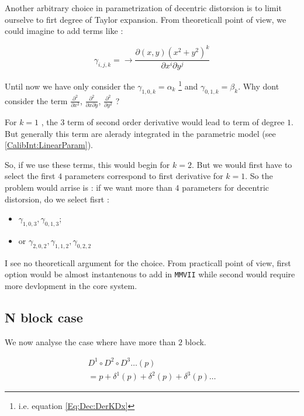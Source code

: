 Another arbitrary choice in parametrization of decentric distorsion is to limit
ourselve to firt degree of Taylor expansion. From theoreticall point of view, we could imagine to add terms like :

\begin{equation}
   \gamma_{i,j,k} = \rightarrow \frac{\partial (x,y)(x^2+y^2)^k}{\partial x^i \partial y^j}
\end{equation}

Until now we have only consider the $\gamma_{1,0,k}=\alpha_k$  \footnote{i.e. equation \ref{Eq:Dec:DerKDx}} and  $\gamma_{0,1,k} = \beta_k$.
Why dont consider the term $ \frac{\partial^2 }{\partial x^2} $, $ \frac{\partial^2 }{\partial x \partial y} $,
 $ \frac{\partial^2 }{\partial y ^2} $ ? 

For $k=1$ , the $3$ term of second order derivative would lead to term of degree $1$. But 
generally this term are alerady integrated in  the parametric model (see \ref{CalibInt:LinearParam}).


So, if we use these terms, this would begin for $k=2$. But we would  first have to select the  first $4$ parameters
correspond to first derivative for $k=1$.  So the problem  would arrise is :  if we want more than $4$ parameters
for decentric distorsion, do we select fisrt :


\begin{itemize}
   \item  $\gamma_{1,0,3},\gamma_{0,1,3}$;
   \item or  $\gamma_{2,0,2}, \gamma_{1,1,2} , \gamma_{0,2,2}$
\end{itemize}

I see no theoreticall argument for the choice.  From practicall point of view, first option would be almost 
instantenous to add in {\tt MMVII} while second would require more devlopment in the core system.


\subsection{N block case}

We now analyse the case where have more than $2$ block.  


\begin{equation}
\begin{multlined}
	D^1 \circ D^2 \circ D^3 \dots (p)  \\
	= p +\delta^1(p) +\delta^2(p) + \delta^3(p) \dots 
\end{multlined}
\end{equation}

